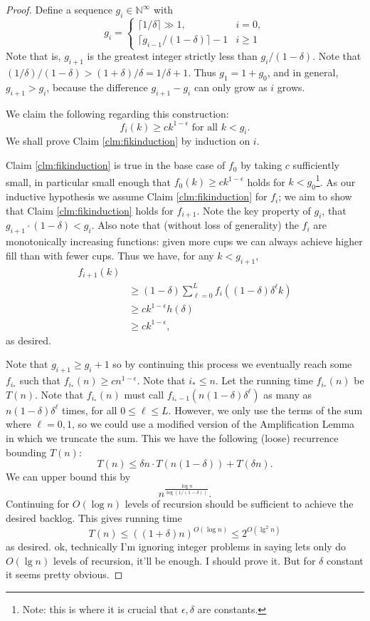 \documentclass[twocolumn]{article}[10pt]
\begin{document}
\begin{proof}
  Define a sequence $g_i \in \mathbb{N}^\infty$ with 
  $$ g_i = \begin{cases}
    \lceil 1/\delta \rceil \gg 1,  & i = 0,\\
    \lceil g_{i-1}/(1-\delta)\rceil -1 & i  \ge 1
  \end{cases} $$
  Note that is, $g_{i+1}$ is the greatest integer strictly less than $g_i/(1-\delta)$.
  Note that $ (1/\delta) / (1-\delta) > (1+\delta)/\delta = 1/\delta + 1.$
  Thus $g_1 = 1+ g_0$, and in general, $g_{i+1} > g_i$, because the difference $g_{i+1}-g_i$ can only grow as $i$ grows.

  We claim the following regarding this construction:
  \begin{equation}
    \label{clm:fikinduction}
    f_i(k) \ge ck^{1-\epsilon} \text{ for all } k < g_i. \tag{*}
  \end{equation}
  We shall prove Claim \ref{clm:fikinduction} by induction on $i$.

  Claim \ref{clm:fikinduction} is true in the base case of $f_0$ by taking $c$ sufficiently small,
  in particular small enough that $f_0(k) \ge ck^{1-\epsilon}$ holds for $k <
  g_0$\footnote{Note: this is where it is crucial that $\epsilon, \delta$
  are constants.}. As our inductive hypothesis we assume Claim \ref{clm:fikinduction} for $f_i$; we aim to show that
  Claim \ref{clm:fikinduction} holds for $f_{i+1}$.
  Note the key property of $g_i$, that $g_{i+1}\cdot(1-\delta) < g_i$. Also
  note that (without loss of generality) the $f_i$ are monotonically increasing
  functions: given more cups we can always achieve higher fill than with fewer
  cups.
  Thus we have, for any $k<g_{i+1}$,
  \begin{align*}
    f_{i+1}(k) &\\
    &\ge (1-\delta)\sum_{\ell=0}^L f_i((1-\delta)\delta^\ell k)\\
    &\ge ck^{1-\epsilon}h(\delta)\\
    &\ge ck^{1-\epsilon},
  \end{align*}
  as desired. 

  Note that $g_{i+1} \ge g_i + 1$ so by continuing this process we eventually
  reach some $f_{i_*}$ such that $f_{i_*}(n) \ge cn^{1-\epsilon}$.
  Note that $i_* \le n$.
  Let the running time $f_{i_*}(n)$ be $T(n)$.
  Note that $f_{i_*}(n)$ must call $f_{i_*-1}(n(1-\delta)\delta^\ell)$ as many
  as $n(1-\delta)\delta^\ell$ times, for all $0 \le \ell\le L$. However, we
  only use the terms of the sum where $\ell=0,1$, so we could use a modified
  version of the Amplification Lemma in which we truncate the sum.
  This we have the following (loose) recurrence bounding $T(n)$:
  $$T(n) \le \delta n \cdot T(n(1-\delta)) + T(\delta n).$$
  We can upper bound this by
  $$n^{\frac{\log n}{\log (1/(1-\delta))}}.$$
  Continuing for $O(\log n)$ levels of recursion should be sufficient to achieve the desired backlog. This gives running time
  $$T(n) \le ((1+\delta) n)^{O(\log n)} \le 2^{O(\lg^2 n)}$$
  as desired.
  {\color{red} ok, technically I'm ignoring integer problems in saying lets
  only do $O(\lg n)$ levels of recursion, it'll be enough. I should prove it.
But for $\delta$ constant it seems pretty obvious.}


\end{proof}
\end{document}
